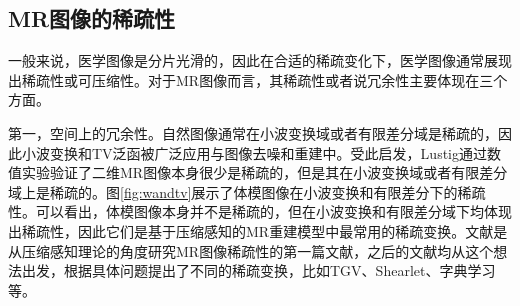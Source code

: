 \subsection{MR图像的稀疏性}
\label{sec:sparsity}
一般来说，医学图像是分片光滑的，因此在合适的稀疏变化下，医学图像通常展现出稀疏性或可压缩性。对于MR图像而言，其稀疏性或者说冗余性主要体现在三个方面。

第一，空间上的冗余性。自然图像通常在小波变换域或者有限差分域是稀疏的，因此小波变换和TV泛函被广泛应用与图像去噪和重建中。受此启发，Lustig\cite{lustig2006}通过数值实验验证了二维MR图像本身很少是稀疏的，但是其在小波变换域或者有限差分域上是稀疏的。图\ref{fig:wandtv}展示了体模图像在小波变换和有限差分下的稀疏性。可以看出，体模图像本身并不是稀疏的，但在小波变换和有限差分域下均体现出稀疏性，因此它们是基于压缩感知的MR重建模型中最常用的稀疏变换。文献\cite{lustig2006}是从压缩感知理论的角度研究MR图像稀疏性的第一篇文献，之后的文献均从这个想法出发，根据具体问题提出了不同的稀疏变换，比如TGV\cite{tgv}、Shearlet\cite{easley2008sparse}、字典学习\cite{ksvd}等。

